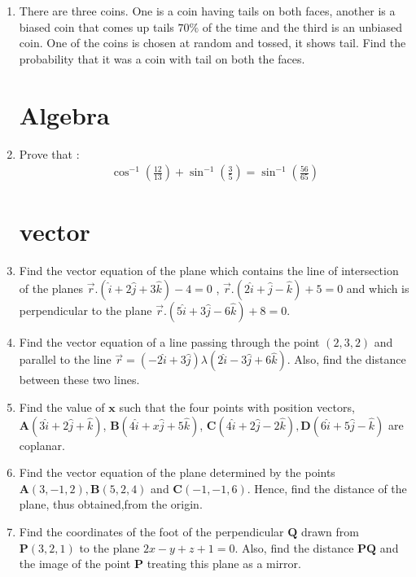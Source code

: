 \documentclass[10pt,-letter paper]{article}
\let\vec\mathbf{}
\let\vec\mathbf{}
\let\vec\mathbf{}
\providecommand{\brak}[1]{\ensuremath{\left(#1\right)}}
\begin{document}
\begin{enumerate}
\item There are three coins. One is a coin having tails on both faces, another is a biased coin that comes up tails $70\%$ of the time and the third is an unbiased coin. One of the coins is chosen at random and tossed, it shows tail. Find the probability that it was a coin with tail on both the faces.

\section{Algebra}
\item Prove that :
\begin{align*}
\cos^{-1}\brak{\frac{12}{13}}+\sin^{-1}\brak{\frac{3}{5}}=\sin^{-1} \brak{\frac{56}{65}}
\end{align*}

\section{vector}
\item Find the vector equation of the plane which contains the line of intersection of the planes 
$ \overrightarrow{r}.\brak{\hat{i} + 2\hat{j}+3\hat{k}}-4=0$ , $\overrightarrow{r}.
\brak{2\hat{i} + \hat{j} - \hat{k}}+5=0$ and which is perpendicular to the plane $\overrightarrow{r}.\brak{5\hat{i} + 3\hat{j} - 6\hat{k}}+8=0$.

\item Find the vector equation of a line passing through the point
$\brak{2, 3, 2}$ and parallel to the line $\overrightarrow{r}=\brak{-2\hat{i} +3\hat{j}}\lambda\brak{2\hat{i} - 3\hat{j}+6\hat{k}}$.
Also, find the distance between these two lines.

\item Find the value of $\vec{x}$ such that the four points with position vectors,
$\vec{A}\brak{3\hat{i} + 2\hat{j} + \hat{k}}$, $\vec{B}\brak{4\hat{i} + x\hat{j} + 5\hat{k}}$, $\vec{C}\brak{4\hat{i} + 2\hat{j} -2 \hat{k}}, \vec{D}\brak{6\hat{i} + 5\hat{j} - \hat{k}}$ are coplanar.

\item Find the vector equation of the plane determined by the points $\vec{A}\brak{3, -1, 2}, \vec{B}\brak{5, 2, 4}$ and $\vec{C}\brak{-1, -1, 6}$. Hence, find the distance of the plane, thus obtained,from the origin.

\item Find the coordinates of the foot of the perpendicular $\vec{Q}$ drawn from $\vec{P}\brak{3, 2, 1}$ to the plane $2x - y + z + 1 = 0$. Also, find the distance $\vec{P}\vec{Q}$ and the image of the point $\vec{P}$ treating this plane as a mirror.


\end{enumerate}
\end{document}
